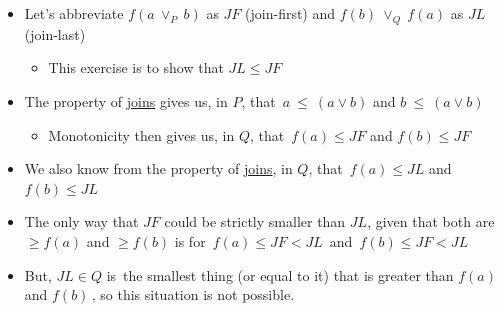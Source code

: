 \begin{itemize}
    \item  Let's abbreviate $f(a\ \lor_P\ b)$ as $JF$ (join-first) and $f(b)\ \lor_Q\  f(a)$ as $JL$ (join-last)
          \begin{itemize}
            \item This exercise is to show that $JL \leq JF$\end{itemize}
    \item The property of \href{doc/1 math/Seven Sketches in Compositionality/Chapter 1: Generative Effects/5 Meets and joins/1 Definition and basic examples/Meet and join}{joins} gives us, in $P$, that \,$a\ \leq\ (a \lor b)$ and $b\ \leq\ (a \lor b)$\,
          \begin{itemize}
            \item Monotonicity then gives us, in $Q$, that \,$f(a) \leq JF$ and $f(b) \leq JF$\,
          \end{itemize}
    \item We also know from the property of \href{doc/1 math/Seven Sketches in Compositionality/Chapter 1: Generative Effects/5 Meets and joins/1 Definition and basic examples/Meet and join}{joins}, in $Q$, that \,$f(a) \leq JL$ and $f(b) \leq JL$\,
    \item The only way that $JF$ could be strictly smaller than $JL$, given that both are $\geq f(a)$ and $\geq f(b)$ is for \,$f(a) \leq JF < JL$\, and  \,$f(b) \leq JF < JL$\,
    \item But, $JL \in Q$ is \,the smallest thing (or equal to it) that is greater than $f(a)$ and $f(b)$\,, so this situation is not possible.
  \end{itemize}